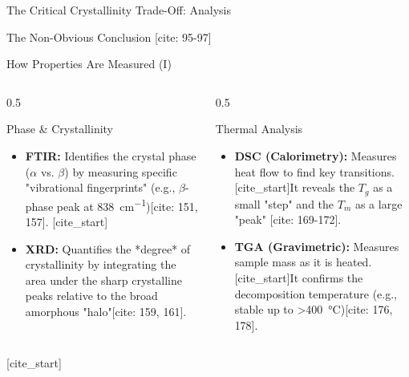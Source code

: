 \documentclass[aspectratio=169]{beamer}
\begin{document}
\begin{frame}{The Critical Crystallinity Trade-Off: Analysis}
\begin{alertblock}{The Non-Obvious Conclusion [cite: 95-97]}
\begin{frame}{How Properties Are Measured (I)}
    \begin{columns}[T]
        \begin{column}{0.5\textwidth}
            \begin{block}{Phase & Crystallinity}
                \begin{itemize}
                    [cite_start]\item \textbf{FTIR:} Identifies the crystal phase ($\alpha$ vs. $\beta$) by measuring specific "vibrational fingerprints" (e.g., $\beta$-phase peak at \SI{838}{cm^{-1}})[cite: 151, 157].
                    [cite_start]\item \textbf{XRD:} Quantifies the *degree* of crystallinity by integrating the area under the sharp crystalline peaks relative to the broad amorphous "halo"[cite: 159, 161].
                \end{itemize}
            \end{block}
        \end{column}
        
        \begin{column}{0.5\textwidth}
            \begin{block}{Thermal Analysis}
                \begin{itemize}
                    \item \textbf{DSC (Calorimetry):} Measures heat flow to find key transitions. [cite_start]It reveals the $T_g$ as a small "step" and the $T_m$ as a large "peak" [cite: 169-172].
                    \item \textbf{TGA (Gravimetric):} Measures sample mass as it is heated. [cite_start]It confirms the decomposition temperature (e.g., stable up to >\SI{400}{\celsius})[cite: 176, 178].
                \end{itemize}
            \end{block}
        \end{column}
    \end{columns}
    
    \vfill
    [cite_start]
    
\end{frame}


\end{alertblock}
\end{frame}
\end{document}
